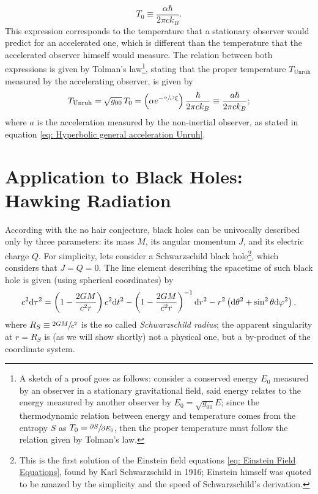 \begin{equation}\label{eq: Unruh temp_0}
	T_0\equiv \frac{\alpha\hbar}{2\pi ck_B}.
\end{equation}
This expression corresponds to the temperature that a stationary observer would predict for an accelerated one, which is different than the temperature that the accelerated observer himself would measure. The relation between both expressions is given by Tolman's law\footnote{A sketch of a proof goes as follows: consider a conserved energy $E_0$ measured by an observer in a stationary gravitational field, said energy relates to the energy measured by another observer by $E_0=\sqrt{g_{00}}E$; since the thermodynamic relation between energy and temperature comes from the entropy $S$ as $T_0=\sfrac{\partial S}{\partial E_0}$, then the proper temperature must follow the relation given by Tolman's law.}, stating that the proper temperature $T_{\text{Unruh}}$ measured by the accelerating observer, is given by
\begin{equation}
	T_{\text{Unruh}}=\sqrt{g_{00}}\,T_0=\left(\alpha e^{-\sfrac{\alpha}{c^2}\xi}\right)\frac{\hbar}{2\pi ck_B}\equiv \frac{a\hbar}{2\pi ck_B};
\end{equation}
where $a$ is the acceleration measured by the non-inertial observer, as stated in equation \ref{eq: Hyperbolic general acceleration Unruh}.

\section{Application to Black Holes: Hawking Radiation}
According with the no hair conjecture, black holes can be univocally described only by three parameters: its mass $M$, its angular momentum $J$, and its electric charge $Q$. For simplicity, lets consider a Schwarzschild black hole\footnote{This is the first solution of the Einstein field equations \ref{eq: Einstein Field Equations}, found by Karl Schwarzschild in 1916; Einstein himself was quoted to be amazed by the simplicity and the speed of Schwarzschild's derivation.}, which considers that $J=Q=0$. The line element describing the spacetime of such black hole \cite{CanoJones} is given (using spherical coordinates) by
\begin{equation}\label{eq: Schwarzschild line element}
	c^2\text{d}\tau^2=\left(1-\frac{2GM}{c^2r}\right)c^2\text{d} t^2-\left(1-\frac{2GM}{c^2r}\right)^{-1}\text{d} r^2-r^2\left(\text{d}\theta^2+\sin^2\theta\text{d}\varphi^2\right),
\end{equation}
where $R_S\equiv\sfrac{2GM}{c^2}$ is the so called \textit{Schwarzschild radius}; the apparent singularity at $r=R_S$ is (as we will show shortly) not a physical one, but a by-product of the coordinate system.

